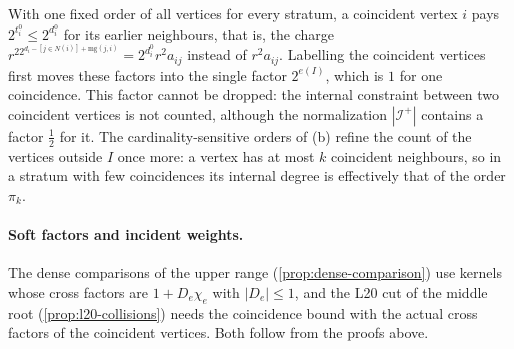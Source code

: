 \begin{remark}\label{rem:collision-fixed-order}
With one fixed order of all vertices for every stratum, a coincident vertex $i$
pays $2^{t^0_i}\le2^{d^0_i}$ for its earlier neighbours, that is, the charge
$r^22^{d_i-[j\in N(i)]+\mathrm{mg}(j,i)}=2^{d^0_i}r^2a_{ij}$ instead of $r^2a_{ij}$.
Labelling the coincident vertices first moves these factors into the single factor
$2^{e(I)}$, which is $1$ for one coincidence. This factor cannot be dropped: the
internal constraint between two coincident vertices is not counted, although the
normalization $|\mathcal I^+|$ contains a factor $\frac12$ for it. The
cardinality-sensitive orders of (b) refine the count of the vertices outside $I$
once more: a vertex has at most $k$ coincident neighbours, so in a stratum with
few coincidences its internal degree is effectively that of the order $\pi_k$.
\end{remark}

\paragraph{Soft factors and incident weights.}
The dense comparisons of the upper range (\cref{prop:dense-comparison}) use
kernels whose cross factors are
$1+D_e\chi_e$ with $|D_e|\le1$, and the L20 cut of the middle root (\cref{prop:l20-collisions}) needs the
coincidence bound with the actual cross factors of the coincident vertices. Both
follow from the proofs above.

